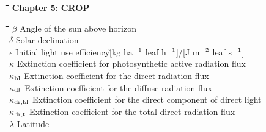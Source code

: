 \documentclass[11pt]{article}
\begin{document}
\bigskip
\nwln
\begin{tabbing}
\hspace{1.27cm}\=\hspace{1.27cm}\=\hspace{1.27cm}\=\hspace{1.27cm}\=%
\hspace{1.27cm}\=\hspace{1.27cm}\=\hspace{1.27cm}\=\hspace{1.27cm}\=%
\hspace{1.27cm}\=\hspace{1.27cm}\=\kill
{\large {\bf Chapter 5:}}\> \> \> {\large {\bf CROP}}
\end{tabbing}
\nwln
\begin{tabbing}
\hspace{1.27cm}\=\hspace{1.27cm}\=\hspace{1.27cm}\=\hspace{1.27cm}\=%
\hspace{1.27cm}\=\hspace{1.27cm}\=\hspace{1.27cm}\=\hspace{1.27cm}\=%
\hspace{1.27cm}\=\hspace{1.27cm}\=\kill
$\beta$\> \> Angle of the sun above horizon\> \> \> \> \> \> \> \> [degrees]\\
$\delta$\> \> Solar declination\> \> \> \> \> \> \> \> [degrees]\\
$\epsilon$\> \> Initial light use efficiency\`[kg ha$^{{\rm -1}}$ leaf h$^{{\rm -1}}$]/[J m$^{{\rm -2}}$ leaf s$^{{\rm -1}}$]\\
$\kappa$\> \> Extinction coefficient for photosynthetic active radiation flux\> \> \> \> \> \> \> \> [-]\\
$\kappa$$_{{\rm bl}}$\> \> Extinction coefficient for the direct radiation flux\> \> \> \> \> \> \> \> [-]\\
$\kappa$$_{{\rm df}}$\> \> Extinction coefficient for the diffuse radiation flux\> \> \> \> \> \> \> \> [-]\\
$\kappa$$_{{\rm dr,bl}}$\> \> Extinction coefficient for the direct component of direct light\> \> \> \> \> \> \> \> [-]\\
$\kappa$$_{{\rm dr,t}}$\> \> Extinction coefficient for the total direct radiation flux\> \> \> \> \> \> \> \> [-]\\
$\lambda$\> \> Latitude\> \> \> \> \> \> \> \> [degrees]\\

\end{tabbing}
\end{document}

